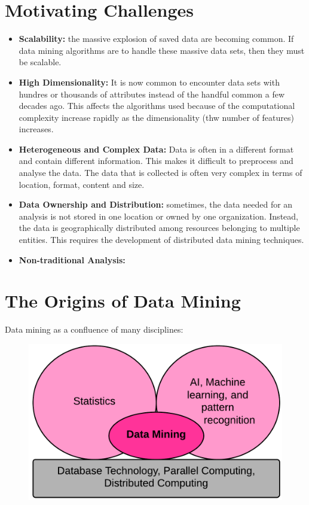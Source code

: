\clearpage
\section{Motivating Challenges}

	\begin{itemize}
		\item {\bf Scalability:} the massive explosion of saved data are becoming common. If data mining 
		algorithms are to handle these massive data sets, then they must be scalable.
		\item {\bf High Dimensionality:} It is now common to encounter data sets with hundres or thousands 
		of attributes instead of the handful common a few decades ago. This affects the algorithms used 
		because of the computational complexity increase rapidly as the dimensionality (thw number of 
		features) increases.
		\item {\bf Heterogeneous and Complex Data:} Data is often in a different format and contain different
		information. This makes it difficult to preprocess and analyse the data. The data that is collected is
		often very complex in terms of location, format, content and size. 
		\item {\bf Data Ownership and Distribution:} sometimes, the data needed for an analysis is not 
		stored in one location or owned by one organization. Instead, the data is geographically distributed 
		among resources belonging to multiple entities. This requires the development of distributed
		data mining techniques. 
		\item {\bf Non-traditional Analysis:} 
	\end{itemize}

\clearpage
\section{The Origins of Data Mining}

	Data mining as a confluence of many disciplines:

	\begin{figure}[H]
		\includegraphics[scale=0.3]{pics/disciplinesDataMining.png}
	\end{figure}

